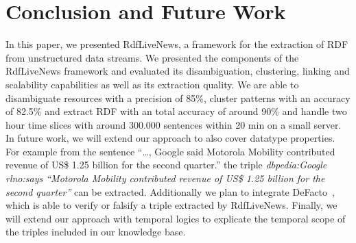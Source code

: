 \documentclass[a4paper]{llncs}
\newcommand{\NAME}{RdfLiveNews}
\begin{document}
\section{Conclusion and Future Work}

In this paper, we presented \NAME{}, a framework for the extraction of RDF from unstructured data streams.
We presented the components of the \NAME{} framework and evaluated its disambiguation, clustering, linking and scalability capabilities as well as its extraction quality.
We are able to disambiguate resources with a precision of 85\%, cluster patterns with an accuracy of 82.5\% and extract RDF with an total accuracy of around 90\% and handle two hour time slices with around 300.000 sentences within 20 min on a small server.
In future work, we will extend our approach to also cover datatype properties.
For example from the sentence ``\dots, Google said Motorola Mobility contributed revenue of US\$ 1.25 billion for the second quarter.'' the triple \textit{dbpedia:Google rlno:says ``Motorola Mobility contributed revenue of US\$ 1.25 billion for the second quarter''} can be extracted.
Additionally we plan to integrate DeFacto~\cite{LEH+12a}, which is able to verify or falsify a triple extracted by \NAME{}.
Finally, we will extend our approach with temporal logics to explicate the temporal scope of the triples included in our knowledge base.
%



%
%
\end{document}
